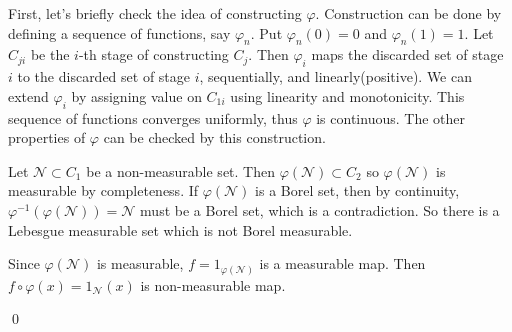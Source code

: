 \begin{exercise}[1.35] \hfill

	First, let's briefly check the idea of constructing $\varphi$.
	Construction can be done by defining a sequence of functions, say $\varphi_n$.
	Put $\varphi_n(0) = 0$ and $\varphi_n(1) = 1$.
	Let $C_{ji}$ be the $i$-th stage of constructing $C_j$.
	Then $\varphi_i$ maps the discarded set of stage $i$ to the discarded set of stage $i$, sequentially, and linearly(positive).
	We can extend $\varphi_i$ by assigning value on $C_{1i}$ using linearity and monotonicity.
	This sequence of functions converges uniformly, thus $\varphi$ is continuous.
	The other properties of $\varphi$ can be checked by this construction.

	Let $\mathcal{N} \subset C_1$ be a non-measurable set.
	Then $\varphi(\mathcal{N}) \subset C_2$ so $\varphi(\mathcal{N})$ is measurable by completeness.
	If $\varphi(\mathcal{N})$ is a Borel set, then by continuity, $\varphi^{-1} ( \varphi (\mathcal{N} ) ) = \mathcal{N}$ must be a Borel set, which is a contradiction.
	So there is a Lebesgue measurable set which is not Borel measurable.

	Since $\varphi (\mathcal{N})$ is measurable, $f = 1_{\varphi(\mathcal{N})}$ is a measurable map.
	Then $f \circ \varphi (x) = 1_{\mathcal{N}}(x)$ is non-measurable map.

	\qed
\end{exercise}

